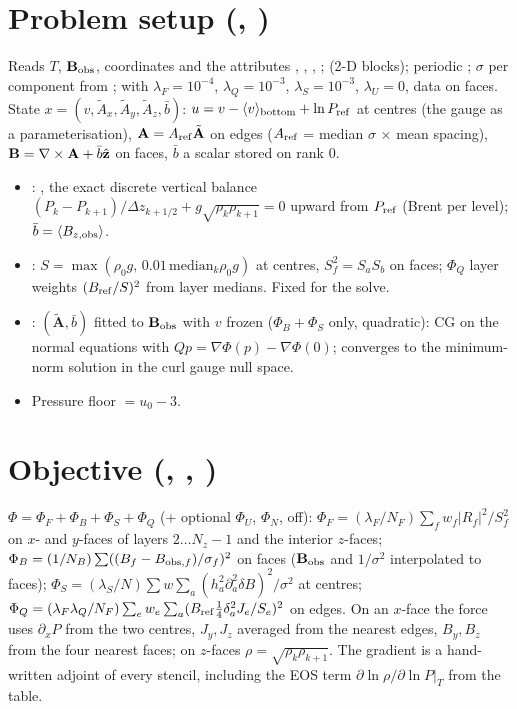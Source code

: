 \section{Problem setup (, )}
Reads $T$, $\mathbf B_{\rm obs}$, coordinates and the attributes , , ,
;  (2-D blocks); periodic ; $\sigma$ per component from
;  with $\lambda_F=10^{-4}$, $\lambda_Q=10^{-3}$, $\lambda_S=10^{-3}$, $\lambda_U=0$, data on
faces. State $x=(v,\tilde A_x,\tilde A_y,\tilde A_z,\bar b)$:
$u=v-\langle v\rangle_{\rm bottom}+\ln P_{\rm ref}$ at centres (the gauge as a parameterisation), $\mathbf A=A_{\rm ref}\tilde{\mathbf A}$
on edges ($A_{\rm ref}$ = median $\sigma$ $\times$ mean spacing), $\mathbf B=\nabla\times\mathbf A+\bar b\hat{\mathbf z}$ on faces, $\bar b$ a
scalar stored on rank 0.
\begin{itemize}
\item {}: , the exact discrete vertical balance
$(P_k-P_{k+1})/\Delta z_{k+1/2}+g\sqrt{\rho_k\rho_{k+1}}=0$ upward from $P_{\rm ref}$ (Brent per level); $\bar b=\langle B_{z,\rm obs}\rangle$.
\item {}: $S=\max(\rho_0g,\,0.01\,\mathrm{median}_k\rho_0g)$ at centres, $S_f^2=S_aS_b$ on faces; $\Phi_Q$ layer
weights $(B_{\rm ref}/S)^2$ from layer medians. Fixed for the solve.
\item {}: $(\tilde{\mathbf A},\bar b)$ fitted to $\mathbf B_{\rm obs}$ with $v$ frozen ($\Phi_B+\Phi_S$ only, quadratic): CG on the
normal equations with $Qp=\nabla\Phi(p)-\nabla\Phi(0)$; converges to the minimum-norm solution in the curl gauge null space.
\item Pressure floor  $=u_0-3$.
\end{itemize}

\section{Objective (, , )}
$\Phi=\Phi_F+\Phi_B+\Phi_S+\Phi_Q$ (+ optional $\Phi_U$, $\Phi_N$, off):
$\Phi_F=(\lambda_F/N_F)\sum_fw_f|R_f|^2/S_f^2$ on $x$- and $y$-faces of layers $2\ldots N_z-1$ and the interior $z$-faces;
$\Phi_B=(1/N_B)\sum((B_f-B_{{\rm obs},f})/\sigma_f)^2$ on faces ($\mathbf B_{\rm obs}$ and $1/\sigma^2$ interpolated to faces);
$\Phi_S=(\lambda_S/N)\sum w\sum_a(h_a^2\partial^2_a\delta B)^2/\sigma^2$ at centres;
$\Phi_Q=(\lambda_F\lambda_Q/N_F)\sum_ew_e\sum_a(B_{\rm ref}\tfrac14\delta_a^2J_e/S_e)^2$ on edges. On an $x$-face the
force uses $\partial_xP$ from the two centres, $J_y,J_z$ averaged from the nearest edges, $B_y,B_z$ from the four nearest
faces; on $z$-faces $\rho=\sqrt{\rho_k\rho_{k+1}}$. The gradient is a hand-written adjoint of every stencil, including the
EOS term $\partial\ln\rho/\partial\ln P|_T$ from the table.

